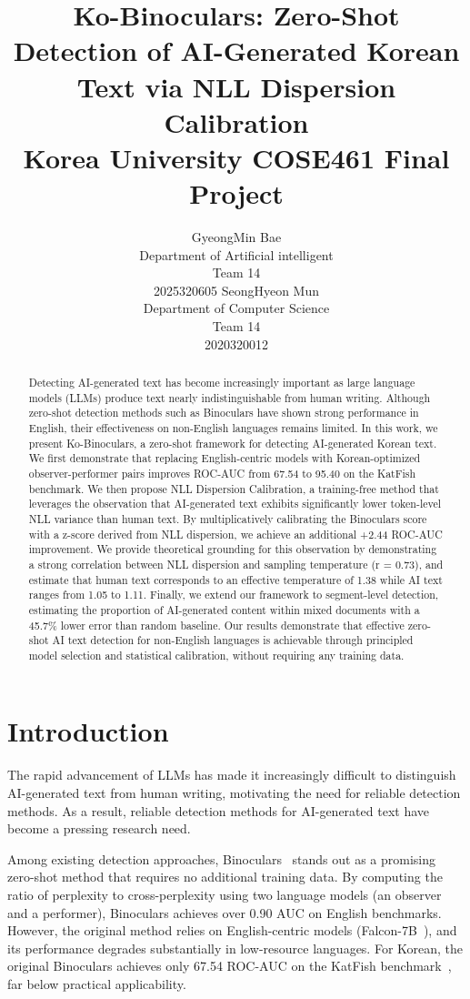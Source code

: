 \documentclass{article}
\title{
  Ko-Binoculars: Zero-Shot Detection of AI-Generated Korean Text via NLL Dispersion Calibration \\
  \vspace{1em}
  \small{\normalfont Korea University COSE461 Final Project}  %
}
\author{
  GyeongMin Bae \\
   Department of Artificial intelligent \\
   Team 14 \\
   2025320605
  \And
  SeongHyeon Mun \\
  Department of Computer Science \\
  Team 14 \\
  2020320012
}
\begin{document}
\maketitle

\begin{abstract}
Detecting AI-generated text has become increasingly important as large language models (LLMs) produce text nearly indistinguishable from human writing. Although zero-shot detection methods such as Binoculars have shown strong performance in English, their effectiveness on non-English languages remains limited. In this work, we present Ko-Binoculars, a zero-shot framework for detecting AI-generated Korean text. We first demonstrate that replacing English-centric models with Korean-optimized observer-performer pairs improves ROC-AUC from 67.54 to 95.40 on the KatFish benchmark. We then propose NLL Dispersion Calibration, a training-free method that leverages the observation that AI-generated text exhibits significantly lower token-level NLL variance than human text. By multiplicatively calibrating the Binoculars score with a z-score derived from NLL dispersion, we achieve an additional +2.44 ROC-AUC improvement. We provide theoretical grounding for this observation by demonstrating a strong correlation between NLL dispersion and sampling temperature (r = 0.73), and estimate that human text corresponds to an effective temperature of 1.38 while AI text ranges from 1.05 to 1.11. Finally, we extend our framework to segment-level detection, estimating the proportion of AI-generated content within mixed documents with a 45.7\% lower error than random baseline. Our results demonstrate that effective zero-shot AI text detection for non-English languages is achievable through principled model selection and statistical calibration, without requiring any training data.
\end{abstract}


\section{Introduction}
The rapid advancement of LLMs has made it increasingly difficult to distinguish AI-generated text from human writing, motivating the need for reliable detection methods. As a result, reliable detection methods for AI-generated text have become a pressing research need.

Among existing detection approaches, Binoculars~\cite{hans2024binoculars} stands out as a promising zero-shot method that requires no additional training data. By computing the ratio of perplexity to cross-perplexity using two language models (an observer and a performer), Binoculars achieves over 0.90 AUC on English benchmarks. However, the original method relies on English-centric models (Falcon-7B~\cite{penedo2023falcon}), and its performance degrades substantially in low-resource languages. For Korean, the original Binoculars achieves only 67.54 ROC-AUC on the KatFish benchmark~\cite{park2025katfishnet}, far below practical applicability.
\end{document}
